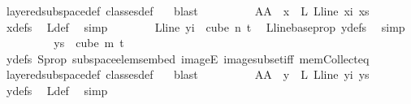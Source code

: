 \begin{isabellebody}
\ layered{\isacharunderscore}{\kern0pt}subspace{\isacharunderscore}{\kern0pt}def\ classes{\isacharunderscore}{\kern0pt}def\ \ \isamarkupfalse%
\ blast\isanewline
\ \ \ \ \ \ \isamarkupfalse%
\ \isamarkupfalse%
\ AA{}{\isacharcolon}{\kern0pt}\ {\isachardoublequoteopen}{\isasymchi}\ x\ {\isacharequal}{\kern0pt}\ {\isasymchi}L\ {\isacharparenleft}{\kern0pt}L{\isacharunderscore}{\kern0pt}line\ xi{\isacharparenright}{\kern0pt}\ xs{\isachardoublequoteclose}\ \isamarkupfalse%
\ xdefs\ \isamarkupfalse%
\ {\isasymchi}L{\isacharunderscore}{\kern0pt}def\ \isamarkupfalse%
\ simp\isanewline
\isanewline
\ \ \ \ \ \ \isamarkupfalse%
\ {\isachardoublequoteopen}{\isacharparenleft}{\kern0pt}L{\isacharunderscore}{\kern0pt}line\ yi{\isacharparenright}{\kern0pt}\ {\isasymin}\ cube\ n\ {\isacharparenleft}{\kern0pt}t{\isacharplus}{\kern0pt}{}{\isacharparenright}{\kern0pt}{\isachardoublequoteclose}\ \isamarkupfalse%
\ L{\isacharunderscore}{\kern0pt}line{\isacharunderscore}{\kern0pt}base{\isacharunderscore}{\kern0pt}prop\ ydefs\ \isamarkupfalse%
\ simp\isanewline
\ \ \ \ \ \ \isamarkupfalse%
\ \isamarkupfalse%
\ {\isachardoublequoteopen}ys\ {\isasymin}\ cube\ m\ {\isacharparenleft}{\kern0pt}t{\isacharplus}{\kern0pt}{}{\isacharparenright}{\kern0pt}{\isachardoublequoteclose}\ \isamarkupfalse%
\ ydefs\ S{\isacharunderscore}{\kern0pt}prop\ subspace{\isacharunderscore}{\kern0pt}elems{\isacharunderscore}{\kern0pt}embed\ imageE\ image{\isacharunderscore}{\kern0pt}subset{\isacharunderscore}{\kern0pt}iff\ mem{\isacharunderscore}{\kern0pt}Collect{\isacharunderscore}{\kern0pt}eq\ \isamarkupfalse%
\ layered{\isacharunderscore}{\kern0pt}subspace{\isacharunderscore}{\kern0pt}def\ classes{\isacharunderscore}{\kern0pt}def\ \ \isamarkupfalse%
\ blast\isanewline
\ \ \ \ \ \ \isamarkupfalse%
\ \isamarkupfalse%
\ AA{}{\isacharcolon}{\kern0pt}\ {\isachardoublequoteopen}{\isasymchi}\ y\ {\isacharequal}{\kern0pt}\ {\isasymchi}L\ {\isacharparenleft}{\kern0pt}L{\isacharunderscore}{\kern0pt}line\ yi{\isacharparenright}{\kern0pt}\ ys{\isachardoublequoteclose}\ \isamarkupfalse%
\ ydefs\ \isamarkupfalse%
\ {\isasymchi}L{\isacharunderscore}{\kern0pt}def\ \isamarkupfalse%
\ simp\isanewline
\isanewline
\ \ \ \ \ \ \isamarkupfalse%

\end{isabellebody}
